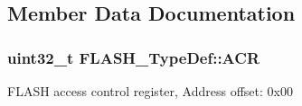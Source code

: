 \subsection{Member Data Documentation}
\hypertarget{struct_f_l_a_s_h___type_def_aaf432a8a8948613f4f66fcace5d2e5fe}{
\subsubsection[{A\-C\-R}]{ uint32\-\_\-t F\-L\-A\-S\-H\-\_\-\-Type\-Def\-::\-A\-C\-R}}\label{struct_f_l_a_s_h___type_def_aaf432a8a8948613f4f66fcace5d2e5fe}
F\-L\-A\-S\-H access control register, Address offset\-: 0x00

